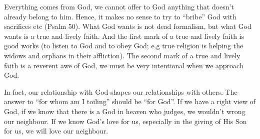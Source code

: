 \begin{itemize}
{  Everything comes from God, we cannot offer to God anything that doesn't
  already belong to him.  Hence, it makes no sense to try to ``bribe'' God
  with sacrifices etc (Psalm 50).  What God wants is not dead formalism, but
  what God wants is a true and lively faith.  And the first mark of a true
  and lively faith is good works (to listen to God and to obey God; e.g true
  religion is helping the widows and orphans in their affliction).  The
  second mark of a true and lively faith is a reverent awe of God, we must be
  very intentional when we approach God.
  
  In fact, our relationship with God shapes our relationships with others.
  The answer to ``for whom am I toiling'' should be ``for God''.  If we have
  a right view of God, if we know that there is a God in heaven who judges,
  we wouldn't wrong our neighbour.  If we know God's love for us, especially
  in the giving of His Son for us, we will love our neighbour.}
\end{itemize}